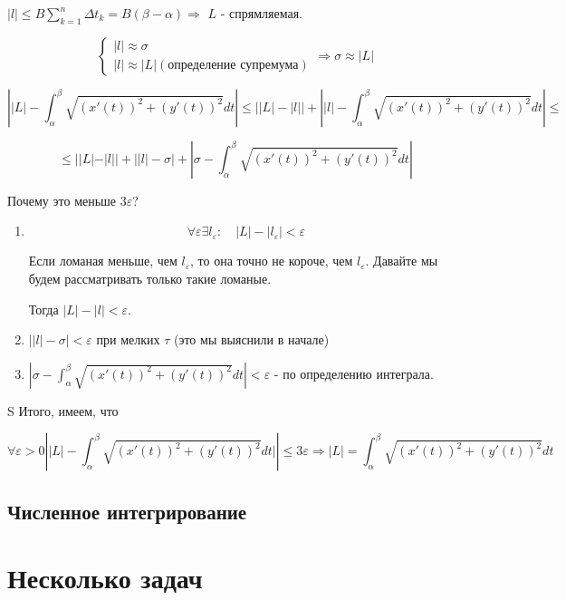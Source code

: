 \documentclass[a4paper]{article}
\begin{document}
\begin{definit}
\begin{hproof}
$|l| \leq B \sum_{k=1}^n \Delta t_k = B(\beta - \alpha) \Rightarrow$ $L$ - спрямляемая.

\[
\begin{cases}
|l| \approx \sigma \\
|l| \approx |L| (\text{определение супремума})
\end{cases} \Rightarrow \sigma \approx |L|
\]

\[
\left| |L| - \int_{\alpha}^{\beta} \sqrt{(x'(t))^2+(y'(t))^2} dt \right| \leq \left| |L| - |l| \right| + \left| |l| - \int_{\alpha}^{\beta} \sqrt{(x'(t))^2+(y'(t))^2} dt \right| \leq
\]

\[
\leq ||L|-|l|| + \left| |l| - \sigma \right| + \left| \sigma - \int_{\alpha}^{\beta}  \sqrt{(x'(t))^2+(y'(t))^2} dt \right|
\]

Почему это меньше $3\varepsilon$?

\begin{enumerate}
\item \[
\forall \varepsilon \exists l_{\varepsilon}: \quad |L| -|l_{\varepsilon}| < \varepsilon
\]

Если ломаная меньше, чем $l_{\varepsilon}$, то она точно не короче, чем $l_{\varepsilon}$. Давайте мы будем рассматривать только такие ломаные.

Тогда $|L| - |l| < \varepsilon$.
\item $\left| |l| - \sigma \right| < \varepsilon$ при мелких $\tau$ (это мы выяснили в начале)
\item $\left| \sigma - \int_{\alpha}^{\beta}  \sqrt{(x'(t))^2+(y'(t))^2} dt \right| < \varepsilon$ - по определению интеграла.

\end{enumerate}
S
Итого, имеем, что 

\[
\forall \varepsilon > 0 \left| |L| -  \int_{\alpha}^{\beta}  \sqrt{(x'(t))^2+(y'(t))^2} dt| \right| \leq 3\varepsilon \Rightarrow |L| = \int_{\alpha}^{\beta}  \sqrt{(x'(t))^2+(y'(t))^2} dt
\]

\end{hproof}

\end{definit}

\hypertarget{p21}{}
\subsection*{Численное интегрирование}
 



\section*{Несколько задач}
\end{document}
